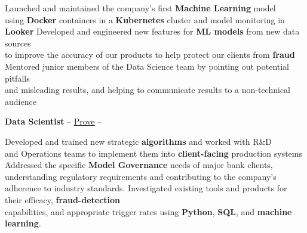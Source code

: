\documentclass[letterpaper,MMMyyyy,nonstopmode]{simpleresumecv}
\begin{document}
\begin{Body}
\begin{Detail}
\BulletItem
Launched and maintained the company's first \textbf{Machine Learning} model \\using \textbf{Docker} containers in a \textbf{Kubernetes} cluster and model monitoring in \textbf{Looker}
\BulletItem
Developed and engineered new features for \textbf{ML models} from new data sources \\to improve the accuracy of our products to help protect our clients from \textbf{fraud}
\BulletItem
Mentored junior members of the Data Science team by pointing out potential pitfalls\\ and misleading results, and helping to communicate results to a non-technical audience

\vspace{3.0mm}


\Entry
\begin{Detail}

\textbf{Data Scientist} -- \href{https://www.prove.com/}{Prove} \hfill {} \hspace{1mm} -- \hspace{1mm} 




\Gap

\BulletItem
Developed and trained new strategic \textbf{algorithms} and worked with R\&D\\ and Operations teams to implement them into \textbf{client-facing} production systems
\BulletItem
Addressed the specific \textbf{Model Governance} needs of major bank clients, understanding regulatory requirements and contributing to the company's adherence to industry standards.
\BulletItem
Investigated existing tools and products for their efficacy, \textbf{fraud-detection}\\ capabilities, and appropriate trigger rates using \textbf{Python}, \textbf{SQL}, and \textbf{machine learning}.



\end{Detail}
\end{Detail}
\end{Body}
\end{document}
